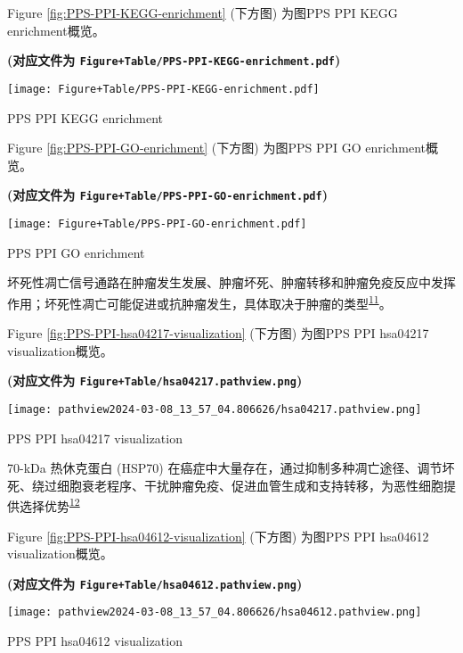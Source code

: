 \documentclass[
]{article}
\begin{document}
Figure \ref{fig:PPS-PPI-KEGG-enrichment} (下方图) 为图PPS PPI KEGG enrichment概览。

\textbf{(对应文件为 \texttt{Figure+Table/PPS-PPI-KEGG-enrichment.pdf})}

\def\@captype{figure}
\begin{center}
\texttt{[image: Figure+Table/PPS-PPI-KEGG-enrichment.pdf]}
\caption{PPS PPI KEGG enrichment}\label{fig:PPS-PPI-KEGG-enrichment}
\end{center}

Figure \ref{fig:PPS-PPI-GO-enrichment} (下方图) 为图PPS PPI GO enrichment概览。

\textbf{(对应文件为 \texttt{Figure+Table/PPS-PPI-GO-enrichment.pdf})}

\def\@captype{figure}
\begin{center}
\texttt{[image: Figure+Table/PPS-PPI-GO-enrichment.pdf]}
\caption{PPS PPI GO enrichment}\label{fig:PPS-PPI-GO-enrichment}
\end{center}

坏死性凋亡信号通路在肿瘤发生发展、肿瘤坏死、肿瘤转移和肿瘤免疫反应中发挥作用；坏死性凋亡可能促进或抗肿瘤发生，具体取决于肿瘤的类型\textsuperscript{\protect\hyperlink{ref-NecroptosisAndYanJ2022}{11}}。

Figure \ref{fig:PPS-PPI-hsa04217-visualization} (下方图) 为图PPS PPI hsa04217 visualization概览。

\textbf{(对应文件为 \texttt{Figure+Table/hsa04217.pathview.png})}

\def\@captype{figure}
\begin{center}
\texttt{[image: pathview2024-03-08\_13\_57\_04.806626/hsa04217.pathview.png]}
\caption{PPS PPI hsa04217 visualization}\label{fig:PPS-PPI-hsa04217-visualization}
\end{center}

70-kDa 热休克蛋白 (HSP70) 在癌症中大量存在，通过抑制多种凋亡途径、调节坏死、绕过细胞衰老程序、干扰肿瘤免疫、促进血管生成和支持转移，为恶性细胞提供选择优势\textsuperscript{\protect\hyperlink{ref-Hsp70MultiFunAlbako2020}{12}}

Figure \ref{fig:PPS-PPI-hsa04612-visualization} (下方图) 为图PPS PPI hsa04612 visualization概览。

\textbf{(对应文件为 \texttt{Figure+Table/hsa04612.pathview.png})}

\def\@captype{figure}
\begin{center}
\texttt{[image: pathview2024-03-08\_13\_57\_04.806626/hsa04612.pathview.png]}
\caption{PPS PPI hsa04612 visualization}\label{fig:PPS-PPI-hsa04612-visualization}
\end{center}
\end{document}
